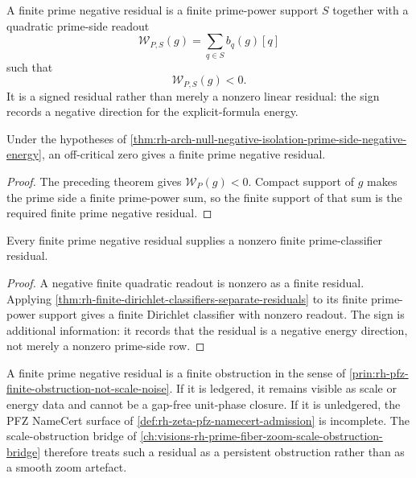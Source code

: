 \begin{definition}
\label{def:rh-finite-prime-negative-residual}
A finite prime negative residual is a finite prime-power support
$S$ together with a quadratic prime-side readout
$$
\mathcal W_{P,S}(g)=\sum_{q\in S}b_q(g)[q]
$$
such that
$$
\mathcal W_{P,S}(g)<0.
$$
It is a signed residual rather than merely a nonzero linear residual:
the sign records a negative direction for the explicit-formula energy.
\end{definition}

\begin{corollary}
\label{cor:rh-offline-zero-gives-finite-prime-negative-residual}
Under the hypotheses of
\autoref{thm:rh-arch-null-negative-isolation-prime-side-negative-energy},
an off-critical zero gives a finite prime negative residual.
\end{corollary}

\begin{proof}
The preceding theorem gives $\mathcal W_P(g)<0$.  Compact support of
$g$ makes the prime side a finite prime-power sum, so the finite support
of that sum is the required finite prime negative residual.
\end{proof}

\begin{theorem}
\label{thm:rh-prime-negative-residual-gives-classifier-obstruction}
Every finite prime negative residual supplies a nonzero finite
prime-classifier residual.
\end{theorem}

\begin{proof}
A negative finite quadratic readout is nonzero as a finite residual.
Applying
\autoref{thm:rh-finite-dirichlet-classifiers-separate-residuals} to its
finite prime-power support gives a finite Dirichlet classifier with
nonzero readout.  The sign is additional information: it records that
the residual is a negative energy direction, not merely a nonzero
prime-side row.
\end{proof}

\begin{principle}
\label{prin:rh-signed-residuals-cannot-hide-by-pfz-smoothing}
A finite prime negative residual is a finite obstruction in the sense of
\autoref{prin:rh-pfz-finite-obstruction-not-scale-noise}.  If it is
ledgered, it remains visible as scale or energy data and cannot be a
gap-free unit-phase closure.  If it is unledgered, the PFZ NameCert
surface of \autoref{def:rh-zeta-pfz-namecert-admission} is incomplete.
The scale-obstruction bridge of
\autoref{ch:visions-rh-prime-fiber-zoom-scale-obstruction-bridge}
therefore treats such a residual as a persistent obstruction rather than
as a smooth zoom artefact.
\end{principle}

